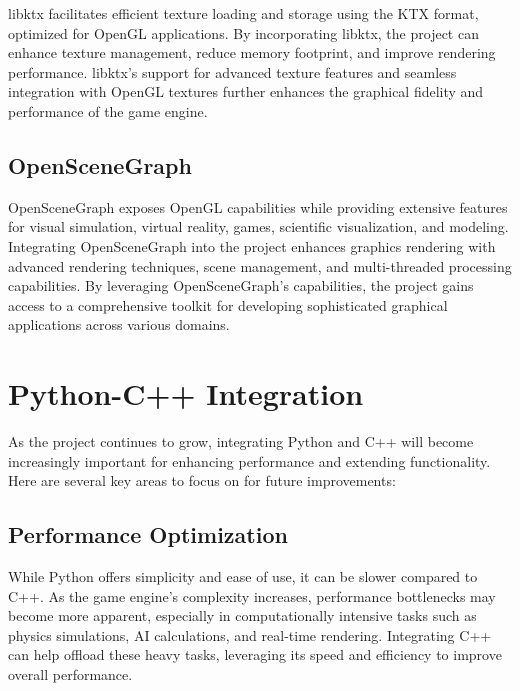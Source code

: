 libktx facilitates efficient texture loading and storage using the KTX format, optimized for OpenGL applications. By incorporating libktx, the project can enhance texture management, reduce memory footprint, and improve rendering performance. libktx's support for advanced texture features and seamless integration with OpenGL textures further enhances the graphical fidelity and performance of the game engine.

\subsection*{OpenSceneGraph}

OpenSceneGraph exposes OpenGL capabilities while providing extensive features for visual simulation, virtual reality, games, scientific visualization, and modeling. Integrating OpenSceneGraph into the project enhances graphics rendering with advanced rendering techniques, scene management, and multi-threaded processing capabilities. By leveraging OpenSceneGraph's capabilities, the project gains access to a comprehensive toolkit for developing sophisticated graphical applications across various domains.







\pagebreak



\section*{Python-C++ Integration}

As the project continues to grow, integrating Python and C++ will become increasingly important for enhancing performance and extending functionality. Here are several key areas to focus on for future improvements:

\subsection*{Performance Optimization}

While Python offers simplicity and ease of use, it can be slower compared to C++. As the game engine's complexity increases, performance bottlenecks may become more apparent, especially in computationally intensive tasks such as physics simulations, AI calculations, and real-time rendering. Integrating C++ can help offload these heavy tasks, leveraging its speed and efficiency to improve overall performance.

